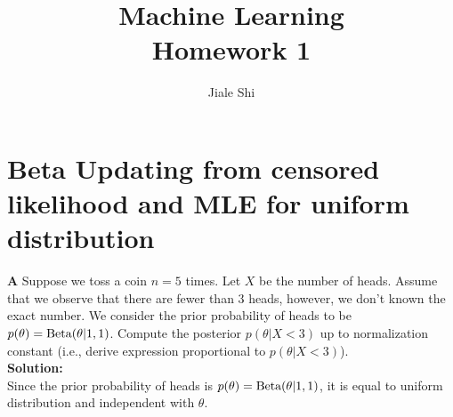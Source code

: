 \documentclass{article}
\title{Machine Learning\\[1em] Homework 1}
\author{Jiale Shi}
\begin{document}
\maketitle

\newpage
\section{Beta Updating from censored likelihood and MLE for uniform distribution}
\textbf{A} Suppose we toss a coin $n=5$ times. Let $X$ be the number of heads. Assume that we observe that there are fewer than 3 heads, however, we don't known the exact number. We consider the prior probability of heads to be $p(\theta) = \rm Beta(\theta|1,1)$. Compute the posterior $p(\theta|X<3)$ up to normalization constant (i.e., derive expression proportional to $p(\theta|X<3)$).
\\
\textbf{Solution:} \\
Since the prior probability of heads is $p(\theta) = \rm Beta(\theta|1,1)$, it is equal to uniform distribution and independent with $\theta$.
\end{document}
